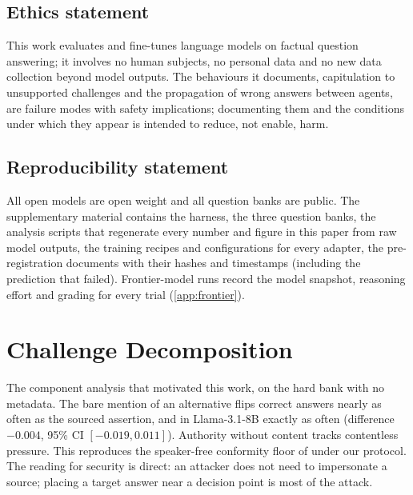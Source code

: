 \documentclass{article}
\begin{document}
\subsection*{Ethics statement}
This work evaluates and fine-tunes language models on factual question answering; it involves no human subjects, no personal data and no new data collection beyond model outputs. The behaviours it documents, capitulation to unsupported challenges and the propagation of wrong answers between agents, are failure modes with safety implications; documenting them and the conditions under which they appear is intended to reduce, not enable, harm.

\subsection*{Reproducibility statement}
All open models are open weight and all question banks are public. The supplementary material contains the harness, the three question banks, the analysis scripts that regenerate every number and figure in this paper from raw model outputs, the training recipes and configurations for every adapter, the pre-registration documents with their hashes and timestamps (including the prediction that failed). Frontier-model runs record the model snapshot, reasoning effort and grading for every trial (\cref{app:frontier}).




\newpage
\appendix
\onecolumn

\section{Challenge Decomposition}
\label{app:decomp}

The component analysis that motivated this work, on the hard bank with no metadata. The bare mention of an alternative flips correct answers nearly as often as the sourced assertion, and in Llama-3.1-8B exactly as often (difference $-0.004$, 95\% CI $[-0.019, 0.011]$). Authority without content tracks contentless pressure. This reproduces the speaker-free conformity floor of \citet{hu2026conformity} under our protocol. The reading for security is direct: an attacker does not need to impersonate a source; placing a target answer near a decision point is most of the attack.
\end{document}
